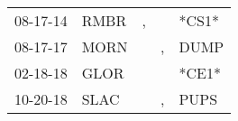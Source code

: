 \begin{supertabular}{p{0.07\textwidth}p{0.06\textwidth}p{0.02\textwidth}p{0.02\textwidth}p{0.06\textwidth}}
 08-17-14\textsuperscript{} &           RMBR\textsuperscript{} &             , &               &                            *CS1* \\
 08-17-17\textsuperscript{} &           MORN\textsuperscript{} &               &             , &           DUMP\textsuperscript{} \\
 02-18-18\textsuperscript{} &           GLOR\textsuperscript{} &               &               &                            *CE1* \\
 10-20-18\textsuperscript{} &           SLAC\textsuperscript{} &               &             , &           PUPS\textsuperscript{} \\
\end{supertabular}
